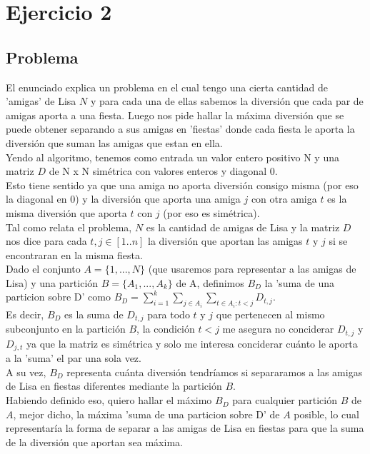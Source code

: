 \section{Ejercicio 2}

\subsection{Problema}
El enunciado explica un problema en el cual tengo una cierta cantidad de 'amigas' de Lisa $N$ y para cada una de ellas sabemos la diversión que cada par de amigas aporta a una fiesta. Luego nos pide hallar la máxima diversión que se puede obtener separando a sus amigas en 'fiestas' donde cada fiesta le aporta la diversión que suman las amigas que estan en ella. \\
Yendo al algoritmo, tenemos como entrada un valor entero positivo N y una matriz $D$ de N x N simétrica con valores enteros y diagonal 0. \\
Esto tiene sentido ya que una amiga no aporta diversión consigo misma (por eso la diagonal en 0) y la diversión que aporta una amiga $j$ con otra amiga $t$ es la misma diversión que aporta $t$ con $j$ (por eso es simétrica). \\
Tal como relata el problema, $N$ es la cantidad de amigas de Lisa y la matriz $D$ nos dice para cada $t,j \in [1..n]$ la diversión que aportan las amigas $t$ y $j$ si se encontraran en la misma fiesta. \\
Dado el conjunto $A = \{1,...,N\}$ (que usaremos para representar a las amigas de Lisa) y una partición $B = \{A_1,...,A_k\}$ de A, definimos $B_D$ la 'suma de una particion sobre D' como $B_D = \sum_{i=1}^{k}{\sum_{j \in A_i}^{}{\sum_{t \in A_i : t < j}^{}{D_{t,j}}}}$. \\
Es decir, $B_D$ es la suma de $D_{t,j}$ para todo $t$ y $j$ que pertenecen al mismo subconjunto en la partición $B$, la condición $t < j$ me asegura no conciderar $D_{t,j}$ y $D_{j,t}$ ya que la matriz es simétrica y solo me interesa conciderar cuánto le aporta a la 'suma' el par una sola vez. \\
A su vez, $B_D$ representa cuánta diversión tendríamos si separaramos a las amigas de Lisa en fiestas diferentes mediante la partición $B$. \\
Habiendo definido eso, quiero hallar el máximo $B_D$ para cualquier partición $B$ de $A$, mejor dicho, la máxima 'suma de una particion sobre D' de $A$ posible, lo cual representaría la forma de separar a las amigas de Lisa en fiestas para que la suma de la diversión que aportan sea máxima.

